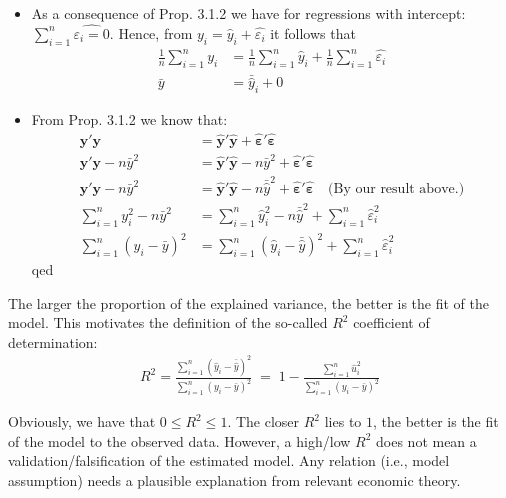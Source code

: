 \documentclass[
]{book}
\begin{document}
\begin{itemize}
\item
  As a consequence of Prop. 3.1.2 we have for regressions with intercept:
  \(\sum_{i=1}^n\hat{\varepsilon_i=0}\). Hence, from \(y_i=\hat{y}_i+\hat{\varepsilon_i}\)
  it follows that
  \begin{align*}
      \frac{1}{n}\sum_{i=1}^n y_i &= \frac{1}{n}\sum_{i=1}^n \hat{y}_i+\frac{1}{n}\sum_{i=1}^n \hat{\varepsilon_i} \\
      \bar{y} &= \bar{\hat{y}}_i+0
    \end{align*}
\item
  From Prop. 3.1.2 we know that:
  \begin{align*}
  \mathbf{y}'\mathbf{y} &= \hat{\mathbf{y}}'\hat{\mathbf{y}}+\hat{\boldsymbol{\varepsilon}}'\hat{\boldsymbol{\varepsilon}} \\
       \mathbf{y}'\mathbf{y} -n\bar{y}^2 &= \hat{\mathbf{y}}'\hat{\mathbf{y}}-n\bar{y}^2+\hat{\boldsymbol{\varepsilon}}'\hat{\boldsymbol{\varepsilon}} \\
       \mathbf{y}'\mathbf{y}-n\bar{y}^2 &= \hat{\mathbf{y}}'\hat{\mathbf{y}}-n\bar{\hat{y}}^2+\hat{\boldsymbol{\varepsilon}}'
       \hat{\boldsymbol{\varepsilon}}\quad\text{(By our result above.)} \\
       \sum_{i=1}^n y_i^2-n\bar{y}^2 &= \sum_{i=1}^n\hat{y}_i^2-n\bar{\hat{y}}^2+\sum_{i=1}^n\hat{\varepsilon}_i^2 \\
       \sum_{i=1}^n (y_i-\bar{y})^2 &= \sum_{i=1}^n (\hat{y}_i-\bar{\hat{y}})^2+\sum_{i=1}^n \hat{\varepsilon}_i^2
  \end{align*}
  qed
\end{itemize}

\hfill\break

The larger the proportion of the explained variance, the better is the
fit of the model. This motivates the definition of the so-called \(R^2\)
coefficient of determination:
\begin{align*}
  R^2=\frac{\sum_{i=1}^n\left(\hat{y}_i-\bar{\hat{y}}\right)^2}{\sum_{i=1}^n\left(y_i-\bar{y}\right)^2}\;=\;1-\frac{\sum_{i=1}^n\hat{u}_i^2}{\sum_{i=1}^n\left(y_i-\bar{y}\right)^2}
\end{align*}

Obviously, we have that \(0\leq R^2\leq 1\). The closer \(R^2\) lies to \(1\),
the better is the fit of the model to the observed data. However, a
high/low \(R^2\) does not mean a validation/falsification of the estimated
model. Any relation (i.e., model assumption) needs a plausible
explanation from relevant economic theory.
\end{document}
